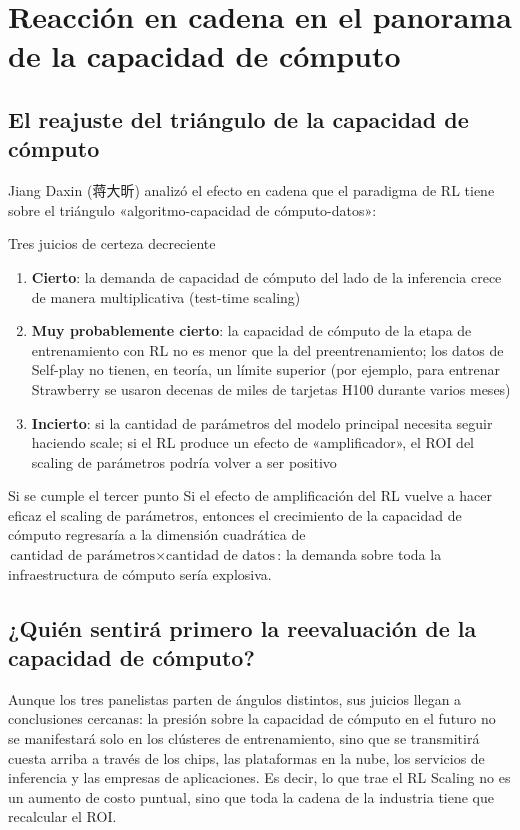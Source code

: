 \section{Reacción en cadena en el panorama de la capacidad de cómputo}

\subsection{El reajuste del triángulo de la capacidad de cómputo}

Jiang Daxin (蒋大昕) analizó el efecto en cadena que el paradigma de RL tiene sobre el triángulo «algoritmo-capacidad de cómputo-datos»:

\begin{importantbox}{Tres juicios de certeza decreciente}
\begin{enumerate}
\item \textbf{Cierto}: la demanda de capacidad de cómputo del lado de la inferencia crece de manera multiplicativa (test-time scaling)
\item \textbf{Muy probablemente cierto}: la capacidad de cómputo de la etapa de entrenamiento con RL no es menor que la del preentrenamiento; los datos de Self-play no tienen, en teoría, un límite superior (por ejemplo, para entrenar Strawberry se usaron decenas de miles de tarjetas H100 durante varios meses)
\item \textbf{Incierto}: si la cantidad de parámetros del modelo principal necesita seguir haciendo scale; si el RL produce un efecto de «amplificador», el ROI del scaling de parámetros podría volver a ser positivo
\end{enumerate}
\end{importantbox}

\begin{warningbox}{Si se cumple el tercer punto}
Si el efecto de amplificación del RL vuelve a hacer eficaz el scaling de parámetros, entonces el crecimiento de la capacidad de cómputo regresaría a la dimensión cuadrática de $\text{cantidad de parámetros} \times \text{cantidad de datos}$: la demanda sobre toda la infraestructura de cómputo sería explosiva.
\end{warningbox}

\subsection{¿Quién sentirá primero la reevaluación de la capacidad de cómputo?}
Aunque los tres panelistas parten de ángulos distintos, sus juicios llegan a conclusiones cercanas: la presión sobre la capacidad de cómputo en el futuro no se manifestará solo en los clústeres de entrenamiento, sino que se transmitirá cuesta arriba a través de los chips, las plataformas en la nube, los servicios de inferencia y las empresas de aplicaciones. Es decir, lo que trae el RL Scaling no es un aumento de costo puntual, sino que toda la cadena de la industria tiene que recalcular el ROI.


